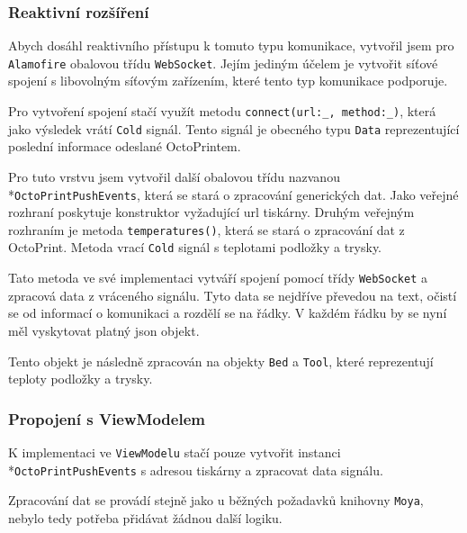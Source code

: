 \subsubsection*{Reaktivní rozšíření}

Abych dosáhl reaktivního přístupu k tomuto typu komunikace, vytvořil jsem pro \texttt{Alamofire} obalovou třídu \texttt{WebSocket}.
Jejím jediným účelem je vytvořit síťové spojení s libovolným síťovým zařízením, které tento typ komunikace podporuje.

Pro vytvoření spojení stačí využít metodu \texttt{connect(url:\_, method:\_)}, která jako výsledek vrátí \texttt{Cold} signál.
Tento signál je obecného typu \texttt{Data} reprezentující poslední informace odeslané OctoPrintem.

Pro tuto vrstvu jsem vytvořil další obalovou třídu nazvanou\\*\texttt{OctoPrintPushEvents}, která se stará o zpracování generických dat.
Jako veřejné rozhraní poskytuje konstruktor vyžadující \acrshort{url} tiskárny.
Druhým veřejným rozhraním je metoda \texttt{temperatures()}, která se stará o zpracování dat z OctoPrint.
Metoda vrací \texttt{Cold} signál s teplotami podložky a trysky.

Tato metoda ve své implementaci vytváří spojení pomocí třídy \texttt{WebSocket} a zpracová data z vráceného signálu.
Tyto data se nejdříve převedou na text, očistí se od informací o komunikaci a rozdělí se na řádky.
V každém řádku by se nyní měl vyskytovat platný \acrshort{json} objekt.

Tento objekt je následně zpracován na objekty \texttt{Bed} a \texttt{Tool}, které reprezentují teploty podložky a trysky.

\subsubsection*{Propojení s ViewModelem}

K implementaci ve \texttt{ViewModelu} stačí pouze vytvořit instanci\\*\texttt{OctoPrintPushEvents} s adresou tiskárny a zpracovat data signálu.

Zpracování dat se provádí stejně jako u běžných požadavků knihovny \texttt{Moya}, nebylo tedy potřeba přidávat žádnou další logiku.
